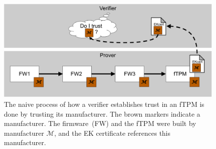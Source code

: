 \begin{figure}[htpb]
  \centering
  \includegraphics[width=1\linewidth]{figures/current_state.pdf}
  \caption{The naive process of how a verifier establishes trust in an \ac{fTPM} is done by trusting its manufacturer. The brown markers indicate a manufacturer. The firmware~(FW) and the fTPM were built by manufacturer \(\mathcal{M}\), and the EK certificate references this manufacturer.}\label{fig:current_state}
\end{figure}
